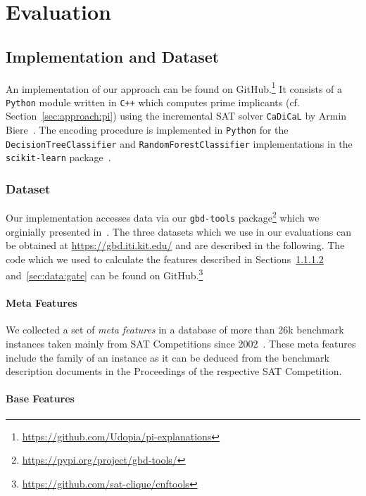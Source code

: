 \documentclass{easychair}
\theoremstyle{definition}
\begin{document}
\section{Evaluation}
\label{sec:evaluation}


\subsection{Implementation and Dataset}
\label{sec:evaluation-impl}

An implementation of our approach can be found on GitHub.\footnote{\url{https://github.com/Udopia/pi-explanations}}
It consists of a \verb!Python! module written in \verb!C++! which computes prime implicants (cf. Section~\ref{sec:approach:pi}) using the incremental SAT solver \verb!CaDiCaL! by Armin Biere~\cite{Biere:2020:Cadical}. 
The encoding procedure is implemented in \verb!Python! for the \verb!DecisionTreeClassifier! and \verb!RandomForestClassifier! implementations in the \verb!scikit-learn! package~\cite{Pedregosa:2011:Scikit}. 


\subsubsection{Dataset}
\label{sec:eval:data}

Our implementation accesses data via our \verb!gbd-tools! package\footnote{\url{https://pypi.org/project/gbd-tools/}} which we orginially presented in~\cite{Iser:2018:GDB}. 
The three datasets which we use in our evaluations can be obtained at \url{https://gbd.iti.kit.edu/} and are described in the following. 
The code which we used to calculate the features described in Sections~\ref{sec:data:base} and~\ref{sec:data:gate} can be found on GitHub.\footnote{\url{https://github.com/sat-clique/cnftools}}


\paragraph{Meta Features}

We collected a set of \emph{meta features} in a database of more than 26k benchmark instances taken mainly from SAT Competitions since 2002~\cite{Froleyks:2021:SC2020}. 
These meta features include the family of an instance as it can be deduced from the benchmark description documents in the Proceedings of the respective SAT Competition. 


\paragraph{Base Features}
\label{sec:data:base}
\end{document}
